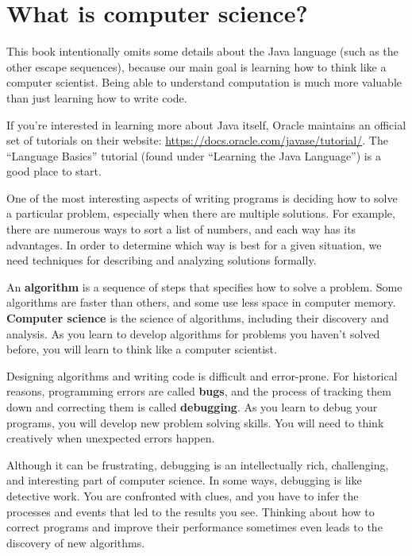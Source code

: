 \section{What is computer science?}

This book intentionally omits some details about the Java language (such as the other escape sequences), because our main goal is learning how to think like a computer scientist.
Being able to understand computation is much more valuable than just learning how to write code.

If you're interested in learning more about Java itself, Oracle maintains an official set of tutorials on their website: \url{https://docs.oracle.com/javase/tutorial/}.
The ``Language Basics'' tutorial (found under ``Learning the Java Language'') is a good place to start.

One of the most interesting aspects of writing programs is deciding how to solve a particular problem, especially when there are multiple solutions.
For example, there are numerous ways to sort a list of numbers, and each way has its advantages.
In order to determine which way is best for a given situation, we need techniques for describing and analyzing solutions formally.


An {\bf algorithm} is a sequence of steps that specifies how to solve a problem.
Some algorithms are faster than others, and some use less space in computer memory.
{\bf Computer science} is the science of algorithms, including their discovery and analysis.
As you learn to develop algorithms for problems you haven't solved before, you will learn to think like a computer scientist.


Designing algorithms and writing code is difficult and error-prone.
For historical reasons, programming errors are called {\bf bugs}, and the process of tracking them down and correcting them is called {\bf debugging}.
As you learn to debug your programs, you will develop new problem solving skills.
You will need to think creatively when unexpected errors happen.

Although it can be frustrating, debugging is an intellectually rich, challenging, and interesting part of computer science.
In some ways, debugging is like detective work.
You are confronted with clues, and you have to infer the processes and events that led to the results you see.
Thinking about how to correct programs and improve their performance sometimes even leads to the discovery of new algorithms.


